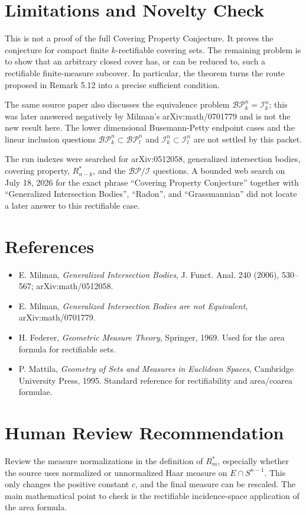 \documentclass[11pt]{article}
\begin{document}
\section*{Limitations and Novelty Check}

This is not a proof of the full Covering Property Conjecture. It proves the
conjecture for compact finite \(k\)-rectifiable covering sets. The remaining
problem is to show that an arbitrary closed cover has, or can be reduced to,
such a rectifiable finite-measure subcover. In particular, the theorem turns
the route proposed in Remark 5.12 into a precise sufficient condition.

The same source paper also discusses the equivalence problem
\(\mathcal{BP}_k^n=\mathcal I_k^n\); this was later answered negatively by
Milman's arXiv:math/0701779 and is not the new result here. The lower
dimensional Busemann-Petty endpoint cases and the linear inclusion questions
\(\mathcal{BP}_k^n\subset\mathcal{BP}_l^n\) and
\(\mathcal I_k^n\subset\mathcal I_l^n\) are not settled by this packet.

The run indexes were searched for arXiv:0512058, generalized intersection
bodies, covering property, \(R_{n-k}^*\), and the \(\mathcal{BP}/\mathcal I\)
questions. A bounded web search on July 18, 2026 for the exact phrase
``Covering Property Conjecture'' together with ``Generalized Intersection
Bodies'', ``Radon'', and ``Grassmannian'' did not locate a later answer to this
rectifiable case.

\section*{References}

\begin{itemize}
\item E. Milman, \emph{Generalized Intersection Bodies}, J. Funct. Anal. 240
(2006), 530--567; arXiv:math/0512058.
\item E. Milman, \emph{Generalized Intersection Bodies are not Equivalent},
arXiv:math/0701779.
\item H. Federer, \emph{Geometric Measure Theory}, Springer, 1969. Used for
the area formula for rectifiable sets.
\item P. Mattila, \emph{Geometry of Sets and Measures in Euclidean Spaces},
Cambridge University Press, 1995. Standard reference for rectifiability and
area/coarea formulae.
\end{itemize}

\section*{Human Review Recommendation}

Review the measure normalizations in the definition of \(R_m^*\), especially
whether the source uses normalized or unnormalized Haar measure on
\(E\cap S^{n-1}\). This only changes the positive constant \(c\), and the final
measure can be rescaled. The main mathematical point to check is the
rectifiable incidence-space application of the area formula.
\end{document}
